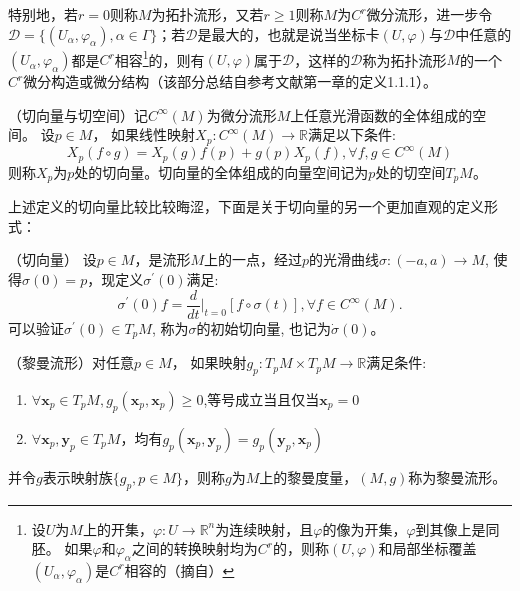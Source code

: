特别地，若$r=0$则称$M$为拓扑流形，又若$r\geq 1$则称$M$为$C^r$微分流形，进一步令$\mathcal{D}=\{(U_{\alpha},\varphi_\alpha),\alpha \in \Gamma\}$；若$\mathcal{D}$是最大的，也就是说当坐标卡$(U,\varphi)$与$\mathcal{D}$中任意的$(U_{\alpha},\varphi_\alpha)$都是$C^r$相容\footnote{设$U$为$M$上的开集，$\varphi:U \rightarrow \mathbb{R}^{n}$为连续映射，且$\varphi$的像为开集，$\varphi$到其像上是同胚。 如果$\varphi$和$\varphi_\alpha$之间的转换映射均为$C^r$的，则称$(U,\varphi)$和局部坐标覆盖$(U_\alpha, \varphi_{\alpha})$是$C^r$相容的（摘自\cite{Manifold}）}的，则有$(U,\varphi)$属于$\mathcal{D}$，这样的$\mathcal{D}$称为拓扑流形$M$的一个$C^r$微分构造或微分结构（该部分总结自参考文献\cite{Manifold}第一章的定义1.1.1）。
\begin{definition}[a]
\label{Tangent_Vector_a}
{\heiti（切向量与切空间）}记$C^\infty(M)$为微分流形$M$上任意光滑函数的全体组成的空间。 设$p \in M$， 如果线性映射$X_p : C^\infty(M) \rightarrow \mathbb{R}$满足以下条件:
\begin{displaymath}
X_p(f\circ g) = X_p(g)f(p)+g(p)X_p(f),\forall f,g \in C^\infty(M)
\end{displaymath}
则称$X_p$为$p$处的切向量。切向量的全体组成的向量空间记为$p$处的切空间$T_pM$。
\end{definition}
上述定义的切向量比较比较晦涩，下面是关于切向量的另一个更加直观的定义形式：
\addtocounter{definition}{-1}
\begin{definition}[b]
\label{Tangent_Vector_b}
{\heiti（切向量）}
设$p\in M$，是流形$M$上的一点，经过$p$的光滑曲线$\sigma: (-a,a) \rightarrow  M$, 使得$\sigma(0)=p$，现定义$\sigma^{\prime}(0)$满足:
\begin{displaymath}
\sigma^{\prime}(0)f=\frac{d}{dt}|_{t=0}[f\circ\sigma(t)],\forall f \in C^\infty(M).
\end{displaymath}
可以验证$\sigma^{\prime}(0)\in T_pM$, 称为$\sigma$的初始切向量, 也记为$\dot{\sigma}(0)$。
\end{definition}
\begin{definition}
{\heiti（黎曼流形）}对任意$p\in M$， 如果映射$g_p : T_pM \times T_pM \rightarrow \mathbb{R}$满足条件:
\begin{enumerate}
\item $\forall \bm{x}_p \in T_p M,g_p(\bm{x}_p,\bm{x}_p)\geq 0$,等号成立当且仅当$\bm{x}_p=0$
\item $\forall \bm{x}_p,\bm{y}_p \in T_p M$，均有$g_p(\bm{x}_p,\bm{y}_p)=g_p(\bm{y}_p,\bm{x}_p)$
\end{enumerate}
并令$g$表示映射族$\{g_p,p\in M\}$，则称$g$为$M$上的黎曼度量，$(M,g)$称为黎曼流形。
\end{definition}
